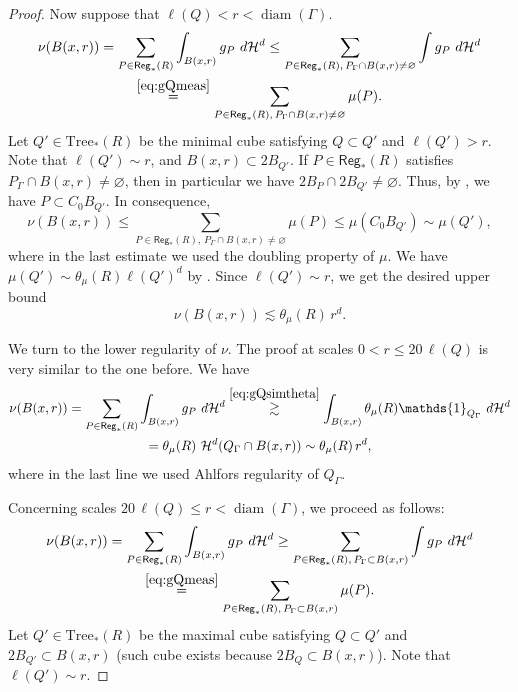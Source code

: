 \documentclass[11pt,reqno]{amsart}
\newcommand{\Tr}{\mathrm{Tree}}
\def\one{\mathds{1}}
\DeclareMathOperator{\diam}{diam}
\theoremstyle{definition}
\theoremstyle{remark}
\numberwithin{equation}{section}
\newcommand{\hd}{\mathcal{H}^d}
\newcommand{\Reg}{\mathsf{Reg}_*}
\theoremstyle{theorem}
\theoremstyle{definition}
\theoremstyle{remark}
\numberwithin{equation}{section}
\begin{document}
\begin{proof}
		Now suppose that $\ell(Q)<r<\diam(\Gamma)$.
		\begin{multline*}
		\nu(B(x,r)) = \sum_{P\in\Reg(R)}\int_{B(x,r)} g_P\ d\hd \le \sum_{P\in\Reg(R),\, P_{\Gamma}\cap B(x,r)\neq\varnothing} \int g_P\ d\hd\\ \overset{\eqref{eq:gQmeas}}{=} \sum_{P\in\Reg(R),\, P_{\Gamma}\cap B(x,r)\neq\varnothing} \mu(P).
		\end{multline*}
		Let $Q'\in\Tr_*(R)$ be the minimal cube satisfying $Q\subset Q'$ and $\ell(Q')>r$. Note that $\ell(Q')\sim r$, and $B(x,r)\subset 2B_{Q'}$. If $P\in\Reg(R)$ satisfies $P_{\Gamma}\cap B(x,r)\neq\varnothing$, then in particular we have $2B_P\cap 2B_{Q'}\neq\varnothing$. Thus, by , we have $P\subset C_0B_{Q'}$.	
		In consequence,
		\begin{equation*}
		\nu(B(x,r)) \le  \sum_{P\in\Reg(R),\, P_{\Gamma}\cap B(x,r)\neq\varnothing} \mu(P)\le \mu(C_0B_{Q'})\sim \mu(Q'),
		\end{equation*}
		where in the last estimate we used the doubling property of $\mu$. We have $\mu(Q')\sim \theta_\mu(R)\ell(Q')^d$ by . Since $\ell(Q')\sim r$, we get the desired upper bound
		\begin{equation*}
		\nu(B(x,r))\lesssim \theta_\mu(R)\, r^d.
		\end{equation*}
		
		We turn to the lower regularity of $\nu$. The proof at scales $0<r\le20\,\ell(Q)$ is very similar to the one before. We have
		\begin{multline*}
		\nu(B(x,r)) = \sum_{P\in\Reg(R)}\int_{B(x,r)} g_P\ d\hd\overset{\eqref{eq:gQsimtheta}}{\gtrsim}  \int_{B(x,r)}\theta_\mu(R)\one_{Q_\Gamma}\ d\hd\\
		= \theta_\mu(R)\ \hd({Q_\Gamma\cap B(x,r)})\sim \theta_\mu(R)\, r^d,
		\end{multline*}
		where in the last line we used Ahlfors regularity of $Q_\Gamma$.
		
		Concerning scales $20\,\ell(Q)\le r<\diam(\Gamma)$, we proceed as follows:
		\begin{multline*}
		\nu(B(x,r)) = \sum_{P\in\Reg(R)}\int_{B(x,r)} g_P\ d\hd \ge \sum_{P\in\Reg(R),\, P_{\Gamma}\subset B(x,r)} \int g_P\ d\hd\\ \overset{\eqref{eq:gQmeas}}{=} \sum_{P\in\Reg(R),\, P_{\Gamma}\subset B(x,r)} \mu(P).
		\end{multline*}
		Let $Q'\in\Tr_*(R)$ be the maximal cube satisfying $Q\subset Q'$ and $2B_{Q'}\subset B(x,r)$ (such cube exists because $2B_Q\subset B(x,r)$). Note that $\ell(Q')\sim r$. 
		

\end{proof}
\end{document}
